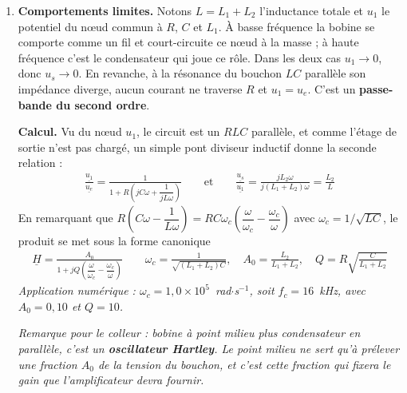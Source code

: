 \newpage

\begin{correction}

\begin{enumerate}

	\item \textbf{Comportements limites.} Notons $L=L_1+L_2$ l'inductance totale et $u_1$ le potentiel du nœud commun à $R$, $C$ et $L_1$. À basse fréquence la bobine se comporte comme un fil et court-circuite ce nœud à la masse ; à haute fréquence c'est le condensateur qui joue ce rôle. Dans les deux cas $u_1\rightarrow0$, donc $u_s\rightarrow0$. En revanche, à la résonance du bouchon $LC$ parallèle son impédance diverge, aucun courant ne traverse $R$ et $u_1=u_e$. C'est un \textbf{passe-bande du second ordre}.

	\textbf{Calcul.} Vu du nœud $u_1$, le circuit est un $RLC$ parallèle, et comme l'étage de sortie n'est pas chargé, un simple pont diviseur inductif donne la seconde relation :
	\begin{align*}
		\frac{\underline{u_1}}{\underline{u_e}}=\frac{1}{1+R\left(jC\omega+\dfrac{1}{jL\omega}\right)}
		\qquad\text{et}\qquad
		\frac{\underline{u_s}}{\underline{u_1}}=\frac{jL_2\omega}{j(L_1+L_2)\omega}=\frac{L_2}{L}
	\end{align*}
	En remarquant que $R\left(C\omega-\dfrac{1}{L\omega}\right)=RC\omega_c\left(\dfrac{\omega}{\omega_c}-\dfrac{\omega_c}{\omega}\right)$ avec $\omega_c=1/\sqrt{LC}$, le produit se met sous la forme canonique
	\begin{align*}
		\boxed{\underline{H}=\frac{A_0}{1+jQ\left(\dfrac{\omega}{\omega_c}-\dfrac{\omega_c}{\omega}\right)}}
		\qquad
		\omega_c=\frac{1}{\sqrt{(L_1+L_2)C}},\quad
		A_0=\frac{L_2}{L_1+L_2},\quad
		Q=R\sqrt{\frac{C}{L_1+L_2}}
	\end{align*}
	\textit{Application numérique : $\omega_c=1,0\times10^{5}$~rad$\cdot$s$^{-1}$, soit $f_c=16$~kHz, avec $A_0=0,10$ et $Q=10$.}

	\textit{Remarque pour le colleur : bobine à point milieu plus condensateur en parallèle, c'est un \textbf{oscillateur Hartley}. Le point milieu ne sert qu'à prélever une fraction $A_0$ de la tension du bouchon, et c'est cette fraction qui fixera le gain que l'amplificateur devra fournir.}


\end{enumerate}
\end{correction}
